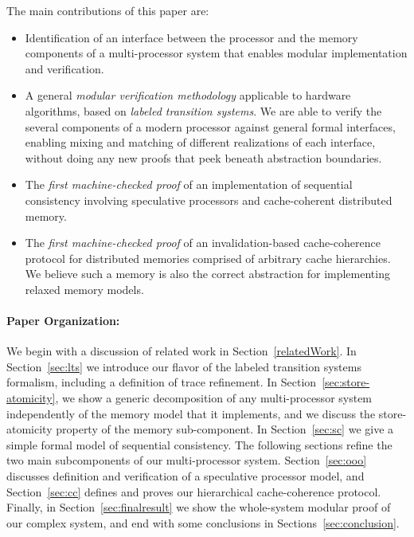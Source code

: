 The main contributions of this paper are:
\vspace{-.3cm}
\begin{itemize} 
\item Identification of an interface between the processor and the memory
components of a multi-processor system that enables modular implementation and
verification.

\item A general \emph{modular verification methodology} applicable to hardware
algorithms, based on \emph{labeled transition systems}.  We are able to verify
the several components of a modern processor against general formal interfaces,
enabling mixing and matching of different realizations of each interface,
without doing any new proofs that peek beneath abstraction boundaries.

\item The \emph{first machine-checked proof} of an implementation of sequential
consistency involving speculative processors and cache-coherent distributed
memory.

\item The \emph{first machine-checked proof} of an invalidation-based
cache-coherence protocol for distributed memories comprised of arbitrary cache
hierarchies. We believe such a memory is also the correct abstraction for
implementing relaxed memory models.
\end{itemize}

\paragraph{Paper Organization:} We begin with a discussion of related work in
Section~\ref{relatedWork}. In Section~\ref{sec:lts} we introduce our flavor of
the labeled transition systems formalism, including a definition of trace
refinement. In Section~\ref{sec:store-atomicity}, we show a generic
decomposition of any multi-processor system independently of the memory model
that it implements, and we discuss the store-atomicity property of the memory
sub-component. In Section~\ref{sec:sc} we give a simple formal model of
sequential consistency.  The following sections refine the two main
subcomponents of our multi-processor system.  Section~\ref{sec:ooo} discusses
definition and verification of a speculative processor model, and
Section~\ref{sec:cc} defines and proves our hierarchical cache-coherence
protocol.  Finally, in Section~\ref{sec:finalresult} we show the whole-system
modular proof of our complex system, and end with some conclusions in
Sections~\ref{sec:conclusion}.

